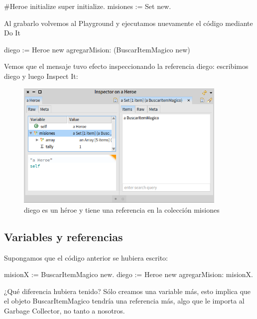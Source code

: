 \documentclass[a4paper,12pt]{book}
\begin{document}
\begin{code}
#Heroe
initialize
	super initialize.
	misiones := Set new.
\end{code}


Al grabarlo volvemos al Playground y ejecutamos nuevamente el código mediante Do It

\begin{code}
diego := Heroe new
  agregarMision: (BuscarItemMagico new)
\end{code}


Vemos que el mensaje tuvo efecto inspeccionando la referencia diego: escribimos diego y luego Inspect It:

\begin{figure}[h!]
    \centering	
    \includegraphics[width=0.9\textwidth]{images/14_coleccion_inicial.png}
    \caption{diego es un héroe y tiene una referencia en la colección misiones}
\end{figure}
\FloatBarrier

\subsection{Variables y referencias}

Supongamos que el código anterior se hubiera escrito:

\begin{code}
misionX := BuscarItemMagico new.
diego := Heroe new
  agregarMision: misionX.
\end{code}

¿Qué diferencia hubiera tenido? Sólo creamos una variable más, esto implica que el objeto BuscarItemMagico 
tendría una referencia más, algo que le importa al Garbage Collector, no tanto a nosotros.
\end{document}
